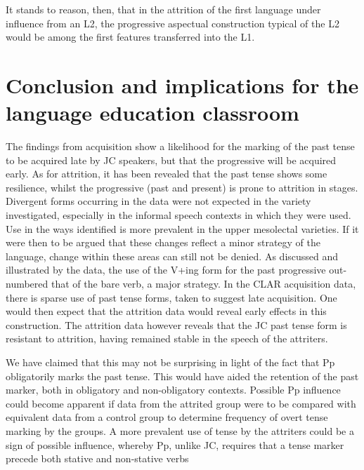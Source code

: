 \documentclass[output=paper,colorlinks,citecolor=brown]{langscibook}
\begin{document}
It stands to reason, then, that in the attrition of the first language under influence from an L2, the progressive aspectual construction typical of the L2 would be among the first features transferred into the L1.


\section{Conclusion and implications for the language education classroom}
\label{sec:messamk:6}
The findings from acquisition show a likelihood for the marking of the past tense to be acquired late by JC speakers, but that the progressive will be acquired early. As for attrition, it has been revealed that the past tense shows some resilience, whilst the progressive (past and present) is prone to attrition in stages. Divergent forms occurring in the data were not expected in the variety investigated, especially in the informal speech contexts in which they were used. Use in the ways identified is more prevalent in the upper mesolectal varieties. If it were then to be argued that these changes reflect a minor strategy of the language, change within these areas can still not be denied. As discussed and illustrated by the data, the use of the V+ing form for the past progressive out-numbered that of the bare verb, a major strategy. In the CLAR acquisition data, there is sparse use of past tense forms, taken to suggest late acquisition. One would then expect that the attrition data would reveal early effects in this construction. The attrition data however reveals that the JC past tense form is resistant to attrition, having remained stable in the speech of the attriters.


We have claimed that this may not be surprising in light of the fact that Pp obligatorily marks the past tense. This would have aided the retention of the past marker, both in obligatory and non-obligatory contexts. Possible Pp influence could become apparent if data from the attrited group were to be compared with equivalent data from a control group to determine frequency of overt tense marking by the groups. A more prevalent use of tense by the attriters could be a sign of possible influence, whereby Pp, unlike JC, requires that a tense marker precede both stative and non-stative verbs
\end{document}
